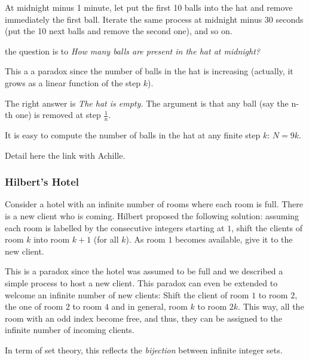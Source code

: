 At midnight minus 1 minute, let put the first 10 balls into the hat and remove immediately the first ball.
Iterate the same process at midnight minus 30 seconds (put the 10 next balls and remove the second one),
and so on.

the question is to \textit{How many balls are present in the hat at midnight?}

This a a paradox since the number of balls in the hat is increasing (actually, it grows as a linear function of the step $k$). 

The right answer is \textit{The hat is empty.}
The argument is that any ball (say the n-th one) is removed at step $\frac{1}{n}$.


It is easy to compute the number of balls in the hat at any finite step $k$: $N = 9k$.


{\Denis Detail here the link with Achille.}


\subsubsection{Hilbert's Hotel}

Consider a hotel with an infinite number of rooms where each room is full.
There is a new client who is coming. 
Hilbert proposed the following solution: assuming each room is labelled by the consecutive integers starting at $1$,
shift the clients of room $k$ into room $k+1$ (for all $k$). 
As room $1$ becomes available, give it to the new client. 

This is a paradox since the hotel was assumed to be full and we described a simple process to host a new client.
This paradox can even be extended to welcome an infinite number of new clients:
Shift the client of room $1$ to room $2$, the one of room $2$ to room $4$ and in general, room $k$ to room $2k$. 
This way, all the room with an odd index become free, and thus, they can be assigned to the infinite number of incoming clients.

In term of set theory, this reflects the \textit{bijection} between infinite integer sets. 


